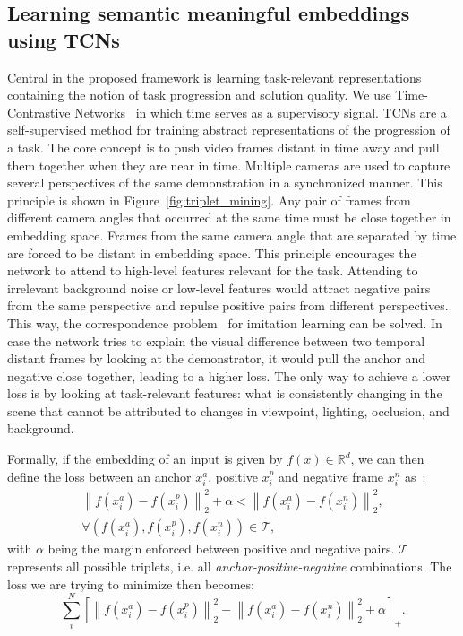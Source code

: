 \documentclass[\home/main.tex]{subfiles}
\begin{document}
\subsection{Learning semantic meaningful embeddings using TCNs}
Central in the proposed framework is learning task-relevant representations containing the notion of task progression and solution quality. We use Time-Contrastive Networks~\cite{Sermanet2017TCN} in which time serves as a supervisory signal. TCNs are a self-supervised method for training abstract representations of the progression of a task. The core concept is to push video frames distant in time away and pull them together when they are near in time. Multiple cameras are used to capture several perspectives of the same demonstration in a synchronized manner. This principle is shown in Figure~\ref{fig:triplet_mining}. Any pair of frames from different camera angles that occurred at the same time must be close together in embedding space. Frames from the same camera angle that are separated by time are forced to be distant in embedding space. This principle encourages the network to attend to high-level features relevant for the task.
Attending to irrelevant background noise or low-level features would attract negative pairs from the same perspective and repulse positive pairs from different perspectives. This way, the correspondence problem~\cite{BrassHeyes2005} for imitation learning can be solved. In case the network tries to explain the visual difference between two temporal distant frames by looking at the demonstrator, it would pull the anchor and negative close together, leading to a higher loss. The only way to achieve a lower loss is by looking at task-relevant features: what is consistently changing in the scene that cannot be attributed to changes in viewpoint, lighting, occlusion, and background.

Formally, if the embedding of an input is given by $f(x) \in \mathbb{R}^d$, we can then define the loss between an anchor $x_i^a$, positive $x_i^p$ and negative frame $x_i^n$ as~\cite{FaceNet}:
\begin{align}
    \left\|f\left(x_{i}^{a}\right)-f\left(x_{i}^{p}\right)\right\|_{2}^{2}+\alpha<\left\|f\left(x_{i}^{a}\right)-f\left(x_{i}^{n}\right)\right\|_{2}^{2} \nonumber, \\
    \forall\left(f\left(x_{i}^{a}\right), f\left(x_{i}^{p}\right), f\left(x_{i}^{n}\right)\right) \in \mathcal{T},    \nonumber
\end{align}
with $\alpha$ being the margin enforced between positive and negative pairs. $\mathcal{T}$ represents all possible triplets, i.e. all \textit{anchor-positive-negative} combinations. The loss we are trying to minimize then becomes:
\begin{equation*}
    \sum_{i}^{N}\left[\left\|f\left(x_{i}^{a}\right)-f\left(x_{i}^{p}\right)\right\|_{2}^{2}-\left\|f\left(x_{i}^{a}\right)-f\left(x_{i}^{n}\right)\right\|_{2}^{2}+\alpha\right]_{+}.
\end{equation*}
\end{document}
